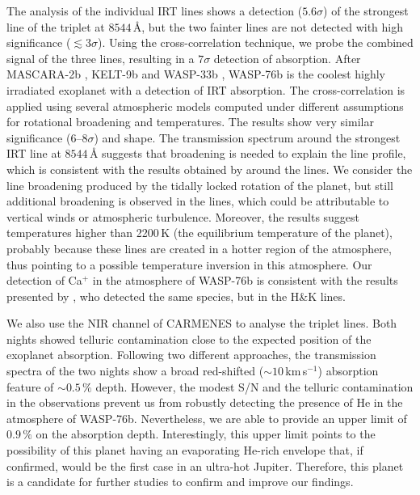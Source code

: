 \documentclass{aa}
\begin{document}
The analysis of the individual  IRT lines shows a detection ($5.6\sigma$) of the strongest line of the triplet at $8544$\,{\AA}, but the two fainter lines are not detected with high significance ($\lesssim 3\sigma$). Using the cross-correlation technique, we probe the combined signal of the three lines, resulting in a $7\sigma$ detection of  absorption. After MASCARA-2b \citep{Casasayas2019}, KELT-9b and WASP-33b \citep{Yan2019}, WASP-76b is the coolest highly irradiated exoplanet with a detection of  IRT absorption. The cross-correlation is applied using several atmospheric models computed under different assumptions for rotational broadening and temperatures. The results show very similar significance (6--8$\sigma$) and shape. The transmission spectrum around the strongest  IRT line at $8544$\,{\AA} suggests that broadening is needed to explain the line profile, which is consistent with the results obtained by \citet{Seidel2019} around the  lines. We consider the line broadening produced by the tidally locked rotation of the planet, but still additional broadening is observed in the lines, which could be attributable to vertical winds or atmospheric turbulence. Moreover, the results suggest temperatures higher than 2200\,K (the equilibrium temperature of the planet), probably because these lines are created in a hotter region of the atmosphere, thus pointing to a possible temperature inversion in this atmosphere. Our detection of Ca$^+$ in the atmosphere of WASP-76b is consistent with the results presented by \citet{Tabernero2020}, who detected the same species, but in the  H\&K lines. 

We also use the NIR channel of CARMENES to analyse the  triplet lines. Both nights showed telluric contamination close to the expected position of the exoplanet absorption. Following two different approaches, the transmission spectra of the two nights show a broad red-shifted ($\sim10$\,km\,s$^{-1}$) absorption feature of $\sim0.5\,\%$ depth. However, the modest S/N and the telluric contamination in the observations prevent us from robustly detecting the presence of He in the atmosphere of WASP-76b. Nevertheless, we are able to provide an upper limit of $0.9\,\%$ on the absorption depth. Interestingly, this upper limit points to the possibility of this planet having an evaporating He-rich envelope that, if confirmed, would be the first case in an ultra-hot Jupiter. Therefore, this planet is a candidate for further studies to confirm and improve our findings.
\end{document}

